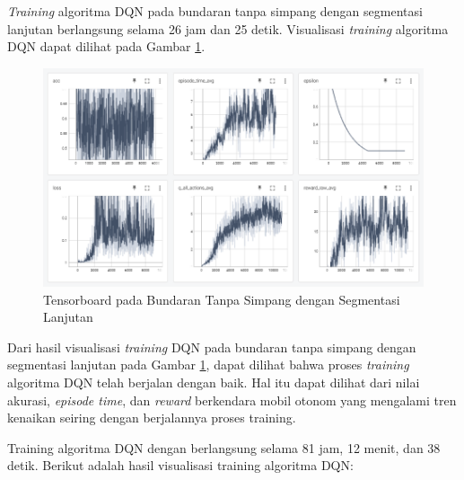 \textit{Training} algoritma DQN pada bundaran tanpa simpang dengan segmentasi lanjutan berlangsung selama 26 jam dan 25 detik. Visualisasi \textit{training} algoritma DQN dapat dilihat pada Gambar \ref{fig:tensorboard_bundaran_tanpasimpang_segmentasi_lanjutan}.

\begin{figure}[H] 
	\centering
	\includegraphics[width=1\linewidth]{images/tensorboard_itemputih_nosimpang}
	\caption{Tensorboard pada Bundaran Tanpa Simpang dengan Segmentasi Lanjutan}
	\label{fig:tensorboard_bundaran_tanpasimpang_segmentasi_lanjutan}
\end{figure}

Dari hasil visualisasi \textit{training} DQN pada bundaran tanpa simpang dengan segmentasi lanjutan pada Gambar \ref{fig:tensorboard_bundaran_tanpasimpang_segmentasi_lanjutan}, dapat dilihat bahwa proses \textit{training} algoritma DQN telah berjalan dengan baik. Hal itu dapat dilihat dari nilai akurasi, \textit{episode time}, dan \textit{reward} berkendara mobil otonom yang mengalami tren kenaikan seiring dengan berjalannya proses training.


\iffalse
Training algoritma DQN dengan
berlangsung selama 81 jam, 12 menit, dan 38 detik. Berikut adalah hasil visualisasi training algoritma DQN:


